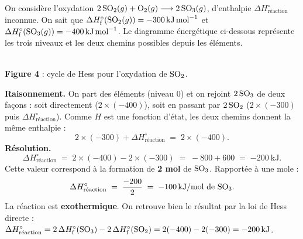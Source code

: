 \documentclass[11pt,a4paper]{article}
\newcommand{\dHr}{\Delta H^{\circ}_{\text{réaction}}}
\newcommand{\dHf}{\Delta H^{\circ}_{\text{f}}}
\begin{document}
\begin{exemple}
On considère l'oxydation \;$2\,\ce{SO2}(g) + \ce{O2}(g) \longrightarrow 2\,\ce{SO3}(g)$\;, d'enthalpie
$\dHr$ inconnue. On sait que $\dHf(\ce{SO2}(g)) = \SI{-300}{\kilo\joule\per\mol}$ et
$\dHf(\ce{SO3}(g)) = \SI{-400}{\kilo\joule\per\mol}$. Le diagramme énergétique ci-dessous représente
les trois niveaux et les deux chemins possibles depuis les éléments.

\begin{center}
\\[2pt]
{\small\textbf{\textcolor{primary}{Figure 4}} : cycle de Hess pour l'oxydation de $\ce{SO2}$.}
\end{center}

\textbf{Raisonnement.} On part des éléments (niveau $0$) et on rejoint $2\,\ce{SO3}$ de deux façons :
soit directement ($2\times(-400)$), soit en passant par $2\,\ce{SO2}$ ($2\times(-300)$ puis $\dHr$).
Comme $H$ est une fonction d'état, les deux chemins donnent la même enthalpie :
\[ 2\times(-300) + \dHr \;=\; 2\times(-400). \]
\textbf{Résolution.}
\[ \dHr \;=\; 2\times(-400) - 2\times(-300) \;=\; -800 + 600 \;=\; \SI{-200}{\kilo\joule}. \]
Cette valeur correspond à la formation de \textbf{2 mol} de $\ce{SO3}$. Rapportée à une mole :
\[ \dHr \;=\; \frac{-200}{2} \;=\; \SI{-100}{\kilo\joule\per\mol\ de\ \ce{SO3}}. \]
La réaction est \textbf{exothermique}. On retrouve bien le résultat par la loi de Hess directe :
$\dHr = 2\,\dHf(\ce{SO3}) - 2\,\dHf(\ce{SO2}) = 2(-400)-2(-300) = \SI{-200}{\kilo\joule}$.
\end{exemple}
\end{document}
